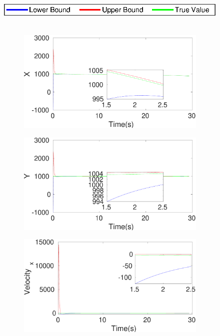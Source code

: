\begin{figure}[!h]
\hspace*{\fill} \includegraphics[scale=0.8]{figures/legend}\\\\
\begin{subfigure}{.5\linewidth}
\centering
\includegraphics[width=\linewidth]{figures/HInf/s3caHInfX}
\end{subfigure}
\begin{subfigure}{.5\linewidth}
\centering
\includegraphics[width=\linewidth]{figures/HInf/s3caHInfY}
\end{subfigure}
\begin{subfigure}{.5\linewidth}
\centering
\includegraphics[width=\linewidth]{figures/HInf/s3caHInfVelocity_x}

\end{subfigure}
\end{figure}
